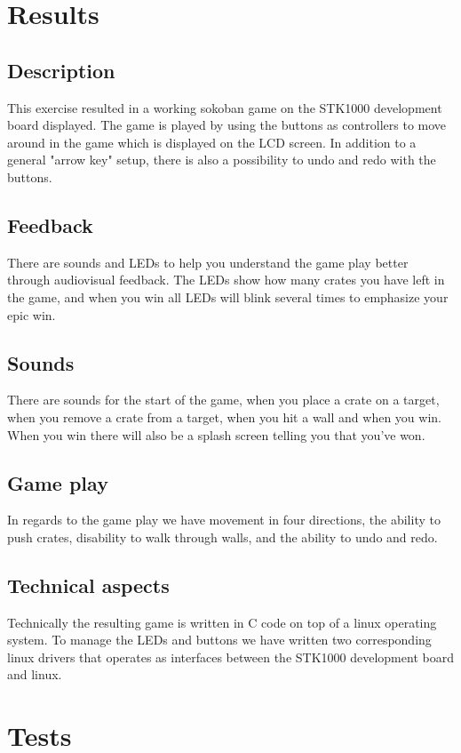 \documentclass[a4paper,11pt]{article}
\begin{document}
\section{Results}
\subsection{Description} 

This exercise resulted in a working sokoban game on the STK1000 development board displayed. The game is played by using the buttons as controllers to move around in the game which is displayed on the LCD screen. In addition to a general "arrow key" setup, there is also a possibility to undo and redo with the buttons. 

\subsection{Feedback}There are sounds and LEDs to help you understand the game play better through audiovisual feedback. The LEDs show how many crates you have left in the game, and when you win all LEDs will blink several times to emphasize your epic win.

\subsection{Sounds}There are sounds for the start of the game, when you place a crate on a target, when you remove a crate from a target, when you hit a wall and when you win. When you win there will also be a splash screen telling you that you've won. 

\subsection{Game play}
In regards to the game play we have movement in four directions, the ability to push crates, disability to walk through walls, and the ability to undo and redo. 

\subsection{Technical aspects}Technically the resulting game is written in C code on top of a linux operating system. To manage the LEDs and buttons we have written two corresponding linux drivers that operates as interfaces between the STK1000 development board and linux. 


\section{Tests}
\end{document}
